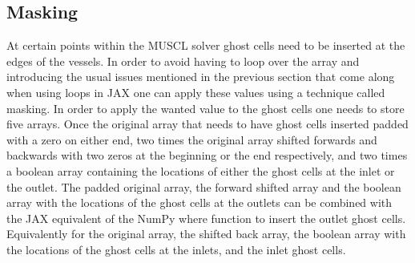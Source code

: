 \documentclass[a4paper, oneside]{discothesis}
\begin{document}
							\subsection{Masking} \label{sec:msk}
							At certain points within the MUSCL solver ghost cells need to be inserted at the edges of the vessels.
							In order to avoid having to loop over the array and introducing the usual issues mentioned in the previous section that come along when using loops in JAX one can apply these values using a technique called masking.
							In order to apply the wanted value to the ghost cells one needs to store five arrays.
							Once the original array that needs to have ghost cells inserted padded with a zero on either end, two times the original array shifted forwards and backwards with two zeros at the beginning or the end respectively, and two times a boolean array containing the locations of either the ghost cells at the inlet or the outlet.
							The padded original array, the forward shifted array and the boolean array with the locations of the ghost cells at the outlets can be combined with the JAX equivalent of the NumPy where function to insert the outlet ghost cells.
							Equivalently for the original array, the shifted back array, the boolean array with the locations of the ghost cells at the inlets, and the inlet ghost cells.
\end{document}
